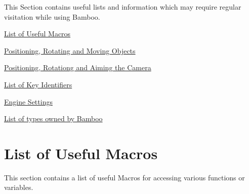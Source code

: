 This Section contains useful lists and information which may require regular visitation while using Bamboo.
\begin{DoxyEnumerate}
\item \hyperlink{_reference_lists_MacroListPage}{List of Useful Macros}
\item \hyperlink{_reference_lists_MatrixUsagePage}{Positioning, Rotating and Moving Objects}
\item \hyperlink{_reference_lists_CameraMatrixUsagePage}{Positioning, Rotationg and Aiming the Camera}
\item \hyperlink{_reference_lists_KeyIdentifiersList}{List of Key Identifiers}
\item \hyperlink{_reference_lists_EngineSettingsPage}{Engine Settings}
\item \hyperlink{_reference_lists_ObjectsUsingTheCreateMacro}{List of types owned by Bamboo}
\end{DoxyEnumerate}\hypertarget{_reference_lists_MacroListPage}{}\section{List of Useful Macros}\label{_reference_lists_MacroListPage}
This section contains a list of useful Macros for accessing various functions or variables.
